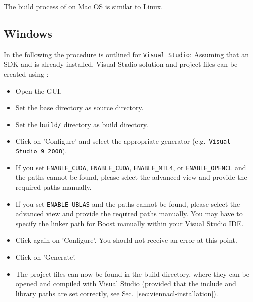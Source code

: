 The build process of {\ViennaCL} on Mac OS is similar to Linux.

\subsection{Windows}
In the following the procedure is outlined for \texttt{Visual Studio}: Assuming that an {\OpenCL} SDK and {\CMake} is already installed, Visual Studio solution and project files can be created using {\CMake}:
\begin{itemize}
\item Open the {\CMake} GUI.
\item Set the {\ViennaCL} base directory as source directory.
\item Set the \texttt{build/} directory as build directory.
\item Click on 'Configure' and select the appropriate generator (e.g.~\texttt{Visual Studio 9 2008}).
\item If you set \lstinline|ENABLE_CUDA|, \lstinline|ENABLE_CUDA|, \lstinline|ENABLE_MTL4|, or \lstinline|ENABLE_OPENCL| and the paths cannot be found, please select the advanced view and provide the required paths manually.
\item If you set \lstinline|ENABLE_UBLAS| and the paths cannot be found, please select the advanced view and provide the required paths manually. You may have to specify the linker path for Boost manually within your Visual Studio IDE.
\item Click again on 'Configure'. You should not receive an error at this point.
\item Click on 'Generate'.
\item The project files can now be found in the {\ViennaCL} build directory, where they can be opened and compiled with Visual Studio (provided that the include and library paths are set correctly, see Sec.~\ref{sec:viennacl-installation}).
\end{itemize}







